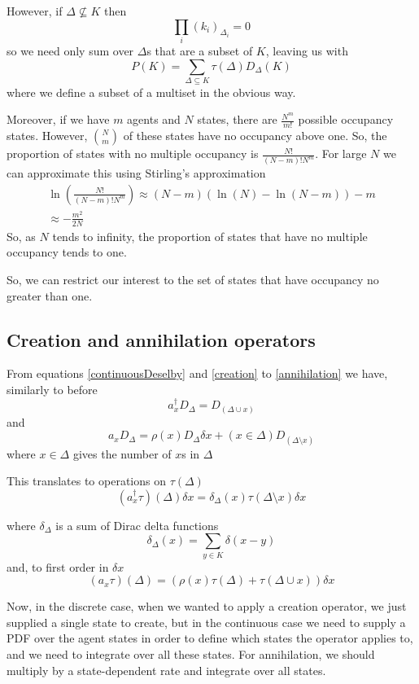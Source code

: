 \documentclass[letterpaper,twocolumn,10pt]{article}
\begin{document}
However, if $\Delta \not\subseteq K$ then
\[
\prod_i(k_i)_{\Delta_i} = 0 
\]
so we need only sum over $\Delta$s that are a subset of $K$, leaving us with
\[
P(K) = \sum_{\Delta\subseteq K} \tau(\Delta) D_\Delta(K)
\]
where we define a subset of a multiset in the obvious way.

Moreover, if we have $m$ agents and $N$ states, there are $\frac{N^m}{m!}$ possible occupancy states. However, ${N \choose m}$ of these states have no occupancy above one. So, the proportion of states with no multiple occupancy is $\frac{N!}{(N-m)!N^m}$. For large $N$ we can approximate this using Stirling's approximation
\[
\begin{split}
\ln\left(\frac{N!}{(N-m)!N^m}\right) 
\approx (N-m)(\ln(N) - \ln(N-m)) - m \\
\approx -\frac{m^2}{2N}
\end{split}
\]
So, as $N$ tends to infinity, the proportion of states that have no multiple occupancy tends to one.

So, we can restrict our interest to the set of states that have occupancy no greater than one.

\subsection{Creation and annihilation operators}

From equations \ref{continuousDeselby} and \ref{creation} to \ref{annihilation} we have, similarly to before
\[
a_x^\dag D_\Delta = D_{(\Delta \cup x)}
\]
and
\[
a_x D_\Delta = \rho(x) D_\Delta \delta x + (x \in \Delta) D_{(\Delta \setminus x)}
\]
where $x \in \Delta$ gives the number of $x$s in $\Delta$

This translates to operations on $\tau(\Delta)$
\[
(a_x^\dag \tau)(\Delta)\delta x = \delta_\Delta(x)\tau(\Delta \setminus x)\delta x
\]

where $\delta_\Delta$ is a sum of Dirac delta functions
\[
\delta_\Delta(x) = \sum_{y\in K}\delta(x-y)
\]
and, to first order in $\delta x$
\[
(a_x \tau)(\Delta) = \left(\rho(x)\tau(\Delta) + \tau(\Delta \cup x)\right) \delta x
\]

Now, in the discrete case, when we wanted to apply a creation operator, we just supplied a single state to create, but in the continuous case we need to supply a PDF over the agent states in order to define which states the operator applies to, and we need to integrate over all these states. For annihilation, we should multiply by a state-dependent rate and integrate over all states.






\end{document}
